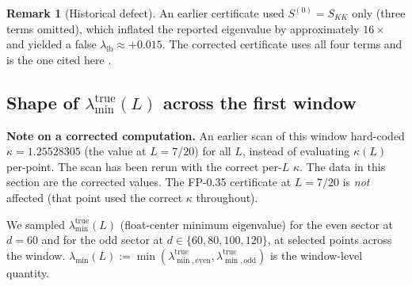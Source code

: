 \documentclass[12pt,a4paper]{amsart}
\theoremstyle{plain}
\theoremstyle{definition}
\newtheorem{remark}[theorem]{Remark}
\newcommand{\llb}{\lambda_{\mathrm{lb}}}
\newcommand{\ltrue}{\lambda_{\min}^{\mathrm{true}}}
\newcommand{\ltrues}[1]{\lambda_{\min,\mathrm{#1}}^{\mathrm{true}}}
\begin{document}
\begin{remark}[Historical defect]
An earlier certificate used $S^{(0)} = S_{KK}$ only (three terms omitted),
which inflated the reported eigenvalue by approximately $16\times$ and yielded
a false $\llb \approx +0.015$.  The corrected certificate uses all four terms
and is the one cited here \cite{Tao2026WFP}.
\end{remark}

\subsection{Shape of \texorpdfstring{$\ltrue(L)$}{λ\_min(L)} across the first window}
\label{sec:first-shape}

\textbf{Note on a corrected computation.}  An earlier scan of this window
hard-coded $\kappa = 1.25528305$ (the value at $L=7/20$) for all $L$, instead
of evaluating $\kappa(L)$ per-point.  The scan has been rerun with the correct
per-$L$ $\kappa$.  The data in this section are the corrected values.
The FP-0.35 certificate at $L=7/20$ is \emph{not} affected (that point used
the correct $\kappa$ throughout).

We sampled $\ltrue(L)$ (float-center minimum eigenvalue) for the even sector
at $d=60$ and for the odd sector at $d \in \{60,80,100,120\}$, at selected
points across the window.  $\lambda_{\min}(L) := \min(\ltrues{even},
\ltrues{odd})$ is the window-level quantity.
\end{document}
